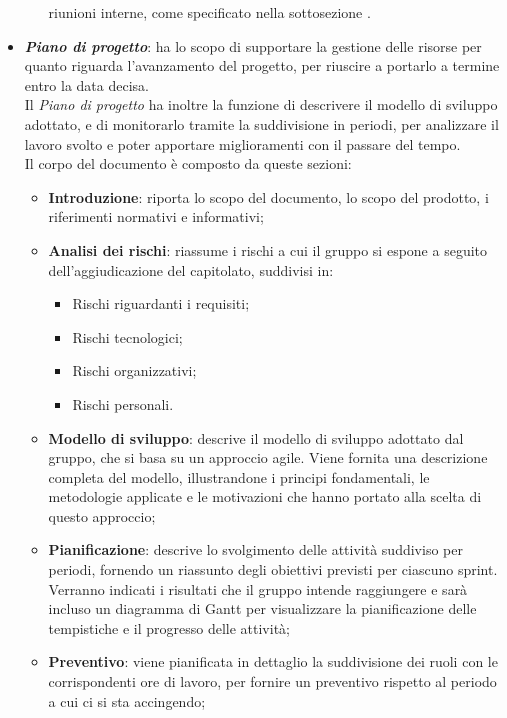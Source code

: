 \begin{itemize}
\begin{itemize}
                        riunioni interne, come specificato nella sottosezione .
            \end{itemize}
      \item \textit{\textbf{Piano di progetto}}: ha lo scopo di supportare la gestione delle risorse per quanto riguarda l'avanzamento del progetto, per riuscire a portarlo a termine entro la data decisa.\\
            Il \textit{Piano di progetto} ha inoltre la funzione di descrivere il modello di sviluppo adottato, e di monitorarlo tramite la suddivisione in periodi, per analizzare il lavoro svolto e poter apportare miglioramenti con il passare del tempo.
            \\Il corpo del documento è composto da queste sezioni:
            \begin{itemize}
                  \item \textbf{Introduzione}: riporta lo scopo del documento, lo scopo del prodotto, i riferimenti normativi e informativi;
                  \item \textbf{Analisi dei rischi}: riassume i rischi a cui il gruppo si espone a seguito dell'aggiudicazione del capitolato, suddivisi in:
                        \begin{itemize}
                              \item Rischi riguardanti i requisiti;
                              \item Rischi tecnologici;
                              \item Rischi organizzativi;
                              \item Rischi personali.
                        \end{itemize}
                  \item \textbf{Modello di sviluppo}: descrive il modello di sviluppo adottato dal gruppo, che si basa su un approccio agile. Viene fornita una descrizione completa del modello, illustrandone i principi fondamentali, le metodologie applicate e le motivazioni che hanno portato alla scelta di questo approccio;
                  \item \textbf{Pianificazione}: descrive lo svolgimento delle attività suddiviso per periodi, fornendo un riassunto degli obiettivi previsti per ciascuno sprint. Verranno indicati i risultati che il gruppo intende raggiungere e sarà incluso un diagramma di Gantt per visualizzare la pianificazione delle tempistiche e il progresso delle attività;
                  \item \textbf{Preventivo}: viene pianificata in dettaglio la suddivisione dei ruoli con le corrispondenti ore di lavoro, per fornire un preventivo rispetto al periodo a cui ci si sta accingendo;

\end{itemize}
\end{itemize}
